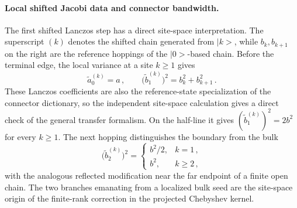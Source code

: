 \documentclass[a4paper,11pt]{article}
\def\ket#1{|#1>}%
\theoremstyle{definition}
\theoremstyle{remark}
\newcommand{\ket}[1]{|#1\rangle}
\begin{document}
\paragraph{Local shifted Jacobi data and connector bandwidth.}
The first shifted Lanczos step has a direct site-space interpretation. The superscript \((k)\) denotes the shifted chain generated from \(\ket k\), while \(b_k,b_{k+1}\) on the right are the reference hoppings of the \(\ket0\)-based chain. Before the terminal edge, the local variance at a site \(k\ge1\) gives
\begin{equation}
   \widetilde a_0^{(k)}=a\,,
   \qquad
   \bigl(\widetilde b_1^{(k)}\bigr)^2=b_k^2+b_{k+1}^2\,.
   \label{eq:tight-binding-local-first-main}
\end{equation}
These Lanczos coefficients are also the reference-state specialization of the connector dictionary, so the independent site-space calculation gives a direct check of the general transfer formalism. On the half-line it gives \((\widetilde b_1^{(k)})^2=2b^2\) for every \(k\ge1\). The next hopping distinguishes the boundary from the bulk
\begin{equation}
   \bigl(\widetilde b_2^{(k)}\bigr)^2=
   \begin{cases}
      b^2/2, & k=1\,,\\
      b^2, & k\ge2\,,
   \end{cases}
   \label{eq:tight-binding-local-second-main}
\end{equation}
with the analogous reflected modification near the far endpoint of a finite open chain. The two branches emanating from a localized bulk seed are the site-space origin of the finite-rank correction in the projected Chebyshev kernel.
\end{document}
